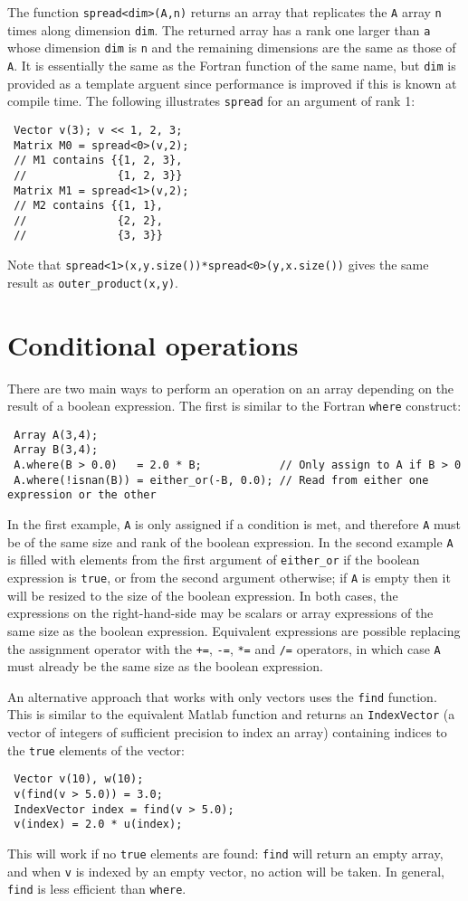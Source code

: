 \documentclass[a4,oneside]{book}
\def\codesize{\small}
\def\code#1{{\codesize\texttt{#1}}}
\begin{document}
The function \code{spread<dim>(A,n)} returns an array that replicates
the \code{A} array \code{n} times along dimension \code{dim}. The
returned array has a rank one larger than \code{a} whose dimension
\code{dim} is \code{n} and the remaining dimensions are the same as
those of \code{A}. It is essentially the same as the Fortran function
of the same name, but \code{dim} is provided as a template arguent
since performance is improved if this is known at compile time.  The
following illustrates \code{spread} for an argument of rank 1:
\begin{lstlisting}
 Vector v(3); v << 1, 2, 3;
 Matrix M0 = spread<0>(v,2);
 // M1 contains {{1, 2, 3},
 //              {1, 2, 3}}
 Matrix M1 = spread<1>(v,2);
 // M2 contains {{1, 1},
 //              {2, 2},
 //              {3, 3}}
\end{lstlisting}
Note that \code{spread<1>(x,y.size())*spread<0>(y,x.size())} gives the
same result as \code{outer\_product(x,y)}.

\section{Conditional operations}
\label{sec:conditional}
There are two main ways to perform an operation on an array depending
on the result of a boolean expression. The first is similar to the
Fortran \code{where} construct:
\begin{lstlisting}
 Array A(3,4);
 Array B(3,4);
 A.where(B > 0.0)   = 2.0 * B;            // Only assign to A if B > 0
 A.where(!isnan(B)) = either_or(-B, 0.0); // Read from either one expression or the other
\end{lstlisting}
In the first example, \code{A} is only assigned if a condition is met,
and therefore \code{A} must be of the same size and rank of the
boolean expression. In the second example \code{A} is filled with
elements from the first argument of \code{either\_or} if the boolean
expression is \code{true}, or from the second argument otherwise; if
\code{A} is empty then it will be resized to the size of the boolean
expression. In both cases, the expressions on the right-hand-side may
be scalars or array expressions of the same size as the boolean
expression.  Equivalent expressions are possible replacing the
assignment operator with the \code{+=}, \code{-=}, \code{*=} and
\code{/=} operators, in which case \code{A} must already be the same
size as the boolean expression.

An alternative approach that works with only vectors uses the
\code{find} function. This is similar to the equivalent Matlab
function and returns an \code{IndexVector} (a vector of integers of
sufficient precision to index an array) containing indices to the
\code{true} elements of the vector:
\begin{lstlisting}
 Vector v(10), w(10);
 v(find(v > 5.0)) = 3.0;
 IndexVector index = find(v > 5.0);
 v(index) = 2.0 * u(index);
\end{lstlisting}
This will work if no \code{true} elements are found: \code{find} will
return an empty array, and when \code{v} is indexed by an empty
vector, no action will be taken.  In general, \code{find} is less
efficient than \code{where}.
\end{document}

